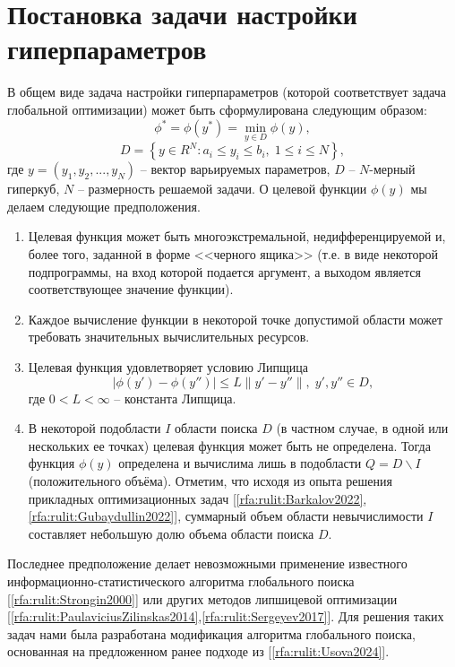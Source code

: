 \documentclass[a4paper,12pt,russian]{article}
\begin{document}

\section{Постановка задачи настройки гиперпараметров}
В общем виде задача настройки гиперпараметров (которой соответствует задача глобальной оптимизации) может быть сформулирована следующим образом:
\begin{equation}\label{eq1} 
\phi^*=\phi(y^* )=\min_{y \in D}{\phi(y)},
\end{equation}
\[
D=\left\{ y \in R^N: a_i \leq y_i \leq b_i, \; 1 \leq i \leq N\right\},
\]
где $y=(y_1,y_2,...,y_N)$ -- вектор варьируемых параметров, $D$ -- $N$-мерный гиперкуб, $N$ -- размерность решаемой задачи.
О целевой функции $\phi (y)$ мы делаем следующие предположения.

\begin{enumerate}
\item{Целевая функция может быть многоэкстремальной, недифференцируемой и, более того, заданной в форме <<черного ящика>> (т.е. в виде некоторой подпрограммы, на вход которой подается аргумент, а выходом является соответствующее значение функции).}
\item{Каждое вычисление функции в некоторой точке допустимой области может требовать значительных вычислительных ресурсов.}
\item{Целевая функция удовлетворяет условию Липщица
\begin{equation}\label{eq3} 
| \phi (y')-\phi (y'') | \leq L \| y'-y'' \|, \; y',y'' \in D,
\end{equation}
где $0<L<\infty$ -- константа Липщица.}
\item{В некоторой подобласти $I$ области поиска $D$ (в частном случае, в одной или нескольких ее точках) целевая функция может быть не определена. Тогда функция $\phi(y)$ определена и вычислима лишь в подобласти $Q = D \backslash I$ (положительного объёма). Отметим, что исходя из опыта решения прикладных оптимизационных задач [\ref{rfa:rulit:Barkalov2022},\ref{rfa:rulit:Gubaydullin2022}], суммарный объем области невычислимости $I$ составляет небольшую долю объема области поиска $D$.}
\end{enumerate}

Последнее предположение делает невозможными применение известного ин\-фор\-ма\-ци\-он\-но-ста\-тис\-ти\-чес\-ко\-го алгоритма глобального поиска [\ref{rfa:rulit:Strongin2000}] или других методов липшицевой оптимизации [\ref{rfa:rulit:PaulaviciusZilinskas2014},\ref{rfa:rulit:Sergeyev2017}]. Для решения таких задач нами была разработана модификация алгоритма глобального поиска, основанная на предложенном ранее подходе из [\ref{rfa:rulit:Usova2024}].
\end{document}
